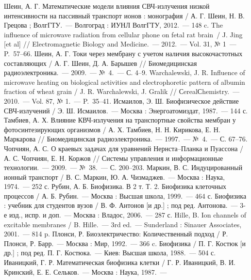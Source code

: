 \def\bibname{СПИСОК ИСПОЛЬЗОВАННЫХ ИСТОЧНИКОВ}
\begin{thebibliography}{99}
 Шеин, А. Г. Математические модели влияния СВЧ-излучения низкой
    интенсивности на пассивный транспорт ионов : монография / А. Г. Шеин, Н. В.
    Грецова ; ВолгГТУ.~--- Волгоград : ИУНЛ ВолгГТУ, 2012.~--- 148 c.
 The influence of microwave radiation from cellular phone on
    fetal rat brain~/ J. Jing [et al] // Electromagnetic Biology and
    Medicine.~--- 2012.~--- Vol. 31, № 1~--- P.~57--66.
 Шеин, А. Г. Токи через мембрану с учетом наличия высокочастотных
    составляющих / А. Г. Шеин, Д. А. Барышев // Биомедицинская радиоэлектроника.~---
    2009.~--- №~4.~--- С. 4--9.
 Warchalewski, J. R. Influence of microwave
    heating on biological activities and electrophoretic pattern of
    albumin fraction of wheat grain /  J. R. Warchalewski, J. Gralik //
    СerealСhemistry.~--- 2010.~--- Vol. 87, № 1.~--- P.~35--41.
 Исмаилов, Э. Ш. Биофизическое действие СВЧ-излучений / Э. Ш.
    Исмаилов.~--- Москва : Энергоатомиздат, 1987.~--- 144 с.
 Тамбиев, А. Х. Влияние КВЧ-излучения на транспортные свойства
    мембран у фотосинтезирующих организмов / А. Х. Тамбиев, Н. Н. Кирикова,
    Е. Н. Маркарова // Биомедицинская радиоэлектроника.~--- 1997.~--- №~4.~--- С.
    67--76.
 Чопчиян, А. С. О краевых задачах для уравнений Нернста--Планка
    и Пуассона / А. С. Чопчиян, Е. Н. Коржов // Системы управления и
    информационные технологии.~--- 2009.~--- №~38.~--- С. 200--203.
 Маркин, В. С. Индуцированный ионный транспорт / В. С. Маркин,
    Ю. А. Чизмаджев.~--- Москва : Наука, 1974.~--- 252 с.
 Рубин, А. Б. Биофизика. В 2 т. Т. 2. Биофизика клеточных
    процессов / А. Б. Рубин.~--- Москва : Высшая школа, 1999.~--- 464 с.
 Биофизика : учебник для студентов вузов / В. Ф. Антонов [и др.] ;
    под ред. Антонова.~--- 3-е изд., испр. и доп.~--- Москва : Владос, 2006.~--- 287 с.
 Hille, B. Ion channels of excitable membranes / B.
    Hille.~--- 3rd ed.~--- Sunderland : Sinauer Associates, 2001.~--- 814 p.
 Плонси, Р. Биоэлектричество: Количественный подход / Р. Плонси,
    Р. Барр.~--- Москва : Мир, 1992.~--- 366 c.
 Биофизика / П. Г. Костюк [и др.] ; под ред. П. Г. Костюка.~--- Киев: Высшая
    школа, 1988.~--- 504 с.
 Иваницкий, Г. Р. Математическая биофизика клетки / Г. Р.
    Иваницкий, В. И. Кринский, Е. Е. Сельков.~--- Москва : Наука, 1987.~---

\end{thebibliography}
